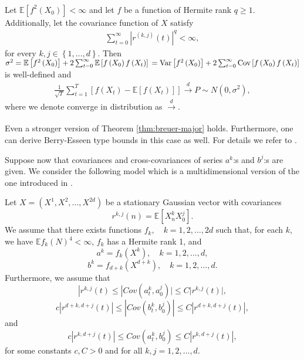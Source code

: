 \documentclass[11pt,a4paper,leqno]{amsart}
\newcommand{\dist}{\xrightarrow[]{d}}
\newcommand{\1}{\mathbbm{1}}
\newcommand{\Var}{\textnormal{Var}}
\newcommand{\Cov}{\textnormal{Cov}}
\newcommand{\E}{\mathbb{E}}
\newcommand{\0}{\mathbf{0}}
\begin{document}
\begin{thm}
\label{thm:breuer-major}
\quad \\
Let $\E\left[f^2\left(X_0\right)\right] < \infty$ and let $f$ be a function of Hermite rank $q \geq 1$. Additionally, let the covariance function of $X$ satisfy
\begin{align*}
\sum_{t=0}^\infty \left|r^{(k,j)}\left(t\right)\right|^q < \infty,
\end{align*}
for every $k,j \in \left\{1,\ldots,d\right\}$. Then $\sigma^2 = \E\left[f^2\left(X_0\right)\right] + 2\sum_{t=0}^\infty \E\left[f\left(X_0\right) f\left(X_t\right) \right]\\ =  \Var\left[f^2\left(X_0\right)\right] + 2 \sum_{t=0}^\infty\Cov\left[f\left(X_0\right)f\left(X_t\right)\right]$ is well-defined and
\begin{align*}
\frac{1}{\sqrt{T}} \sum_{t=1}^T \left[ f\left(X_t\right) - \E\left[f\left(X_t\right)\right] \right] \dist P \sim  N\left(0,\sigma^2\right),
\end{align*}
where we denote converge in distribution as $\dist$.


\end{thm}
\begin{rem}
Even a stronger version of Theorem \ref{thm:breuer-major} holds. Furthermore, one can derive Berry-Esseen type bounds in this case as well. For details we refer to \cite{ivan-et-al}.
\end{rem}
Suppose now that covariances and cross-covariances of series $a^k$:s and $b^j$:s are given.
We consider the following model which is a multidimensional version of the one introduced in \cite{ilm-vii}.
\begin{dfn}
\label{def:model}
Let $X=(X^1,X^2,\ldots,X^{2d})$ be a stationary Gaussian vector with covariances
$$
r^{k,j}(n) = \E [X^k_n X^j_0].
$$
We assume that there exists functions $f_k,\quad k=1,2,\ldots,2d$ such that, for each $k$, we have $\E f_k(N)^4 < \infty$, $f_k$ has a Hermite rank 1, and 
$$
a^k= f_k(X^k), \quad k=1,2,\ldots,d,
$$
$$
b^k = f_{d+k}(X^{d+k}),\quad k=1,2,\ldots,d.
$$
Furthermore, we assume that 
\begin{equation}
\label{eq:cov_a}
|r^{k,j}(t)\leq |Cov(a_t^k,a_0^j)|\leq C |r^{k,j}(t)|,
\end{equation}
\begin{equation}
\label{eq:cov_b}
c|r^{d+k,d+j}(t)| \leq |Cov(b_t^k,b_0^j)| \leq C|r^{d+k,d+j}(t)|,
\end{equation}
and
\begin{equation}
\label{eq:cov_ab}
c|r^{k,d+j}(t)|\leq Cov(a_t^k,b_0^j) \leq C|r^{k,d+j}(t)|,
\end{equation}
for some constants $c,C>0$ and for all $k,j=1,2,\ldots, d$.
\end{dfn}
\end{document}
